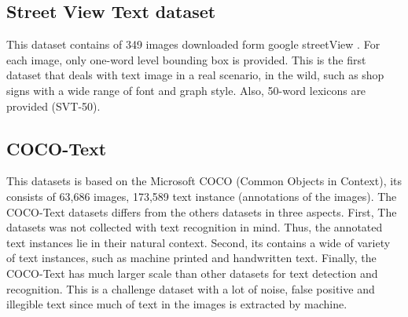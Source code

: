 \documentclass[phd,tocprelim]{cornell}
\begin{document}


\subsection{Street View Text dataset }

This dataset contains of 349 images downloaded form google streetView \cite{wang2010word}. For each image, only one-word level bounding box is provided. This is the first dataset that deals with text image in a real scenario, in the wild, such as shop signs with a wide range of font and graph style. Also, 50-word lexicons are provided (SVT-50). 








\subsection{COCO-Text }
This datasets is based on the Microsoft COCO \cite{lin2014microsoft} (Common Objects in Context), its consists of 63,686 images, 173,589 text instance (annotations of the images). The COCO-Text datasets differs from the others datasets in three aspects. First, The datasets was not collected with text recognition in mind. Thus, the annotated text instances lie in their natural context. Second, its contains a wide of variety of text instances, such as machine printed and handwritten text. Finally, the COCO-Text has much larger scale than other datasets for text detection and recognition.
This is a challenge dataset with a lot of noise, false positive and illegible text since much of  text in the images is extracted by machine. 



\end{document}
